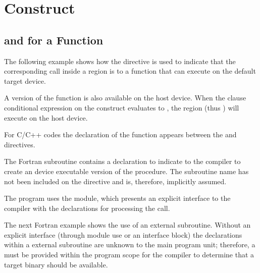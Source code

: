 \pagebreak
\section{  Construct}
\label{sec:declare_target}

\subsection{  and    for a Function}
\label{subsec:declare_target_function}

The following example shows how the   directive 
is used to indicate that the corresponding call inside a  region 
is to a  function that can execute on the default target device.

A version of the function is also available on the host device. When the  
clause conditional expression on the  construct evaluates to , 
the  region (thus ) will execute on the host device.

For C/C++ codes the declaration of the function  appears between the  
 and    directives.


The Fortran  subroutine contains a   declaration 
to indicate to the compiler to create an device executable version of the procedure. 
The subroutine name has not been included on the   
directive and is, therefore, implicitly assumed.

The program uses the  module, which presents an explicit interface to 
the compiler with the   declarations for processing 
the  call.


The next Fortran example shows the use of an external subroutine. Without an explicit 
interface (through module use or an interface block) the   
declarations within a external subroutine are unknown to the main program unit; 
therefore, a   must be provided within the program 
scope for the compiler to determine that a target binary should be available.


